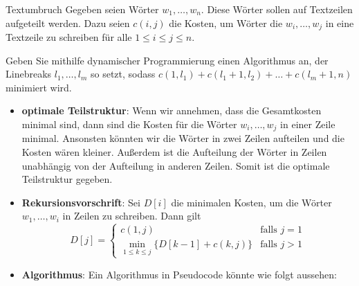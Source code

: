 \documentclass{article}
\begin{document}
\begin{exercise}{Textumbruch}
  Gegeben seien Wörter $w_1, \ldots, w_n$. Diese Wörter sollen auf Textzeilen aufgeteilt werden. Dazu seien $c(i, j)$ die Kosten, um Wörter die $w_i, \ldots, w_j$ in eine Textzeile zu schreiben für alle $1 \leq i \leq j \leq n$.\par
  Geben Sie mithilfe dynamischer Programmierung einen Algorithmus an, der Linebreaks $l_1, \ldots, l_m$ so setzt, sodass $c(1,l_1)+c(l_1 +1,l_2)+\ldots+c(l_m +1,n)$ minimiert wird.

  \begin{solution}
    \begin{itemize}
      \item \textbf{optimale Teilstruktur}: Wenn wir annehmen, dass die Gesamtkosten minimal sind, dann sind die Kosten für die Wörter $w_i, \ldots, w_j$ in einer Zeile minimal. Ansonsten könnten wir die Wörter in zwei Zeilen aufteilen und die Kosten wären kleiner. Außerdem ist die Aufteilung der Wörter in Zeilen unabhängig von der Aufteilung in anderen Zeilen. Somit ist die optimale Teilstruktur gegeben.
      \item \textbf{Rekursionsvorschrift}: Sei $D[i]$ die minimalen Kosten, um die Wörter $w_1, \ldots, w_i$ in Zeilen zu schreiben. Dann gilt \[
              D[j] = \begin{cases}
                c(1,j)                                & \text{falls } j=1 \\
                \min_{1\leq k\leq j}\{D[k-1]+c(k,j)\} & \text{falls } j>1
              \end{cases}
            \]
      \item \textbf{Algorithmus}: Ein Algorithmus in Pseudocode könnte wie folgt aussehen:\par
    \end{itemize}
  \end{solution}
\end{exercise}
\end{document}
